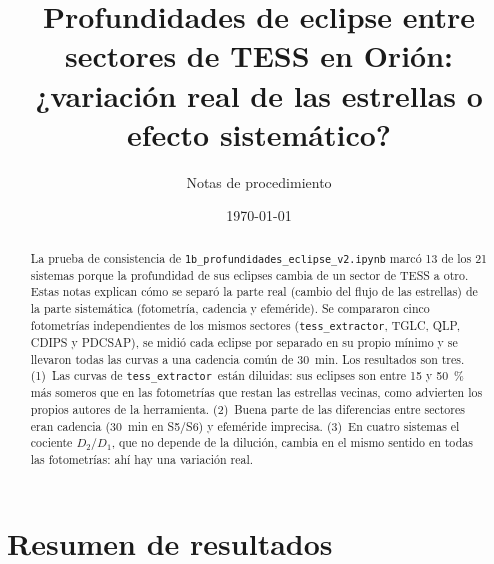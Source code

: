 \documentclass[11pt,a4paper]{article}
\title{Profundidades de eclipse entre sectores de TESS en Orión:\\
¿variación real de las estrellas o efecto sistemático?}
\author{Notas de procedimiento}
\date{\today}
\newcommand{\tx}{\texttt{tess\_extractor}}
\newcommand{\Dum}{D_2/D_1}
\begin{document}
\maketitle

\begin{abstract}
La prueba de consistencia de \texttt{1b\_profundidades\_eclipse\_v2.ipynb} marcó 13 de los 21
sistemas porque la profundidad de sus eclipses cambia de un sector de TESS a otro. Estas notas
explican cómo se separó la parte real (cambio del flujo de las estrellas) de la parte sistemática
(fotometría, cadencia y efeméride). Se compararon cinco fotometrías independientes de los mismos
sectores (\tx, TGLC, QLP, CDIPS y PDCSAP), se midió cada eclipse por separado en su propio mínimo y
se llevaron todas las curvas a una cadencia común de 30~min. Los resultados son tres. (1)~Las
curvas de \tx\ están diluidas: sus eclipses son entre 15 y 50~\% más someros que en las
fotometrías que restan las estrellas vecinas, como advierten los propios autores de la herramienta.
(2)~Buena parte de las diferencias entre sectores eran cadencia (30~min en S5/S6) y efeméride
imprecisa. (3)~En cuatro sistemas el cociente $\Dum$, que no depende de la dilución, cambia en el
mismo sentido en todas las fotometrías: ahí hay una variación real.
\end{abstract}

\tableofcontents

\section{Resumen de resultados}
\end{document}
